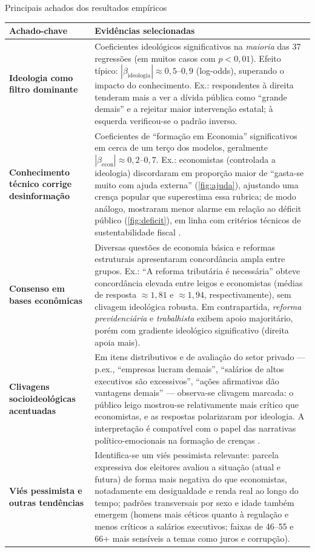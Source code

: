 \begin{quadro}[!htb]\centering\footnotesize
\caption{Principais achados dos resultados empíricos}\label{tab:achados}
\begin{tabular}{p{5.5cm} p{9.5cm}}
\toprule
\textbf{Achado-chave} & \textbf{Evidências selecionadas} \\
\midrule
\textbf{Ideologia como filtro dominante} & Coeficientes ideológicos significativos na \textit{maioria} das 37 regressões (em muitos casos com \(p<0{,}01\)). Efeito típico: \(|\beta_{\text{ideologia}}|\approx0{,}5\text{–}0{,}9\) (log-odds), superando o impacto do conhecimento. Ex.: respondentes à direita tenderam mais a ver a dívida pública como “grande demais” e a rejeitar maior intervenção estatal; à esquerda verificou-se o padrão inverso. \\
\textbf{Conhecimento técnico corrige desinformação} & Coeficientes de “formação em Economia” significativos em cerca de um terço dos modelos, geralmente \(|\beta_{\text{econ}}|\approx0{,}2\text{–}0{,}7\). Ex.: economistas (controlada a ideologia) discordaram em proporção maior de “gasta-se muito com ajuda externa” (\autoref{fig:ajuda}), ajustando uma crença popular que superestima essa rubrica; de modo análogo, mostraram menor alarme em relação ao déficit público (\autoref{fig:deficit}), em linha com critérios técnicos de sustentabilidade fiscal \cite{The_Myth_of_the_Rational_Voter}. \\
\textbf{Consenso em bases econômicas} & Diversas questões de economia básica e reformas estruturais apresentaram concordância ampla entre grupos. Ex.: “A reforma tributária é necessária” obteve concordância elevada entre leigos e economistas (médias de resposta \(\approx1{,}81\) e \(\approx1{,}94\), respectivamente), sem clivagem ideológica robusta. Em contrapartida, \textit{reforma previdenciária} e \textit{trabalhista} exibem apoio majoritário, porém com gradiente ideológico significativo (direita apoia mais). \\
\textbf{Clivagens socioideológicas acentuadas} & Em itens distributivos e de avaliação do setor privado — p.ex., “empresas lucram demais”, “salários de altos executivos são excessivos”, “ações afirmativas dão vantagens demais” — observa-se clivagem marcada: o público leigo mostrou-se relativamente mais crítico que economistas, e as respostas polarizaram por ideologia. A interpretação é compatível com o papel das narrativas político-emocionais na formação de crenças \cite{westen2007political}. \\
\textbf{Viés pessimista e outras tendências} & Identifica-se um viés pessimista relevante: parcela expressiva dos eleitores avaliou a situação (atual e futura) de forma mais negativa do que economistas, notadamente em desigualdade e renda real ao longo do tempo; padrões transversais por sexo e idade também emergem (homens mais céticos quanto à regulação e menos críticos a salários executivos; faixas de 46–55 e 66+ mais sensíveis a temas como juros e corrupção). \\
\bottomrule
\end{tabular}
\end{quadro}

